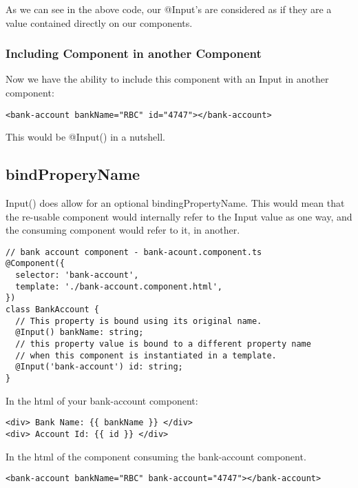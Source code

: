 As we can see in the above code, our @Input's are considered as if they are
a value contained directly on our components.


\subsubsection{ Including Component in another Component }
Now we have the ability to include this component with an Input in another
component:
\begin{lstlisting}
<bank-account bankName="RBC" id="4747"></bank-account>
\end{lstlisting}

This would be @Input() in a nutshell.

\subsection{ bindProperyName }
Input() does allow for an optional bindingPropertyName. This would mean that
the re-usable component would internally refer to the Input value as one way,
and the consuming component would refer to it, in another.

\begin{lstlisting}
// bank account component - bank-acount.component.ts
@Component({
  selector: 'bank-account',
  template: './bank-account.component.html',
})
class BankAccount {
  // This property is bound using its original name.
  @Input() bankName: string;
  // this property value is bound to a different property name
  // when this component is instantiated in a template.
  @Input('bank-account') id: string;
}
\end{lstlisting}

In the html of your bank-account component:
\begin{lstlisting}
<div> Bank Name: {{ bankName }} </div>
<div> Account Id: {{ id }} </div>
\end{lstlisting}

In the html of the component consuming the bank-account component.
\begin{lstlisting}
<bank-account bankName="RBC" bank-account="4747"></bank-account>
\end{lstlisting}
